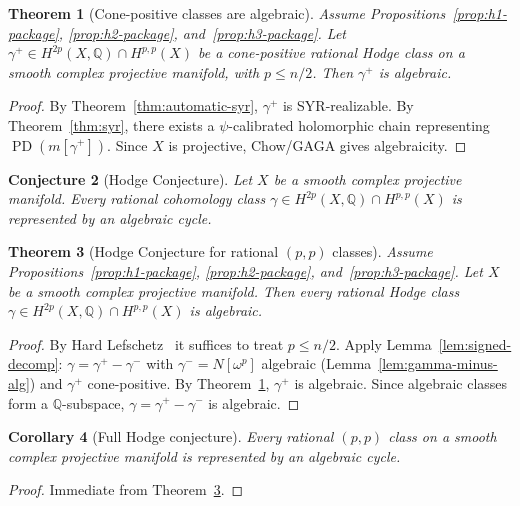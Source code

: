 \documentclass[11pt]{article}
\numberwithin{equation}{section}
\theoremstyle{plain}
\newtheorem{theorem}{Theorem}[section]
\newtheorem{conjecture}[theorem]{Conjecture}
\newtheorem{corollary}[theorem]{Corollary}
\theoremstyle{definition}
\theoremstyle{remark}
\DeclareMathOperator{\PD}{PD}
\newcommand{\Q}{\mathbb{Q}}
\begin{document}
\begin{theorem}[Cone-positive classes are algebraic]
\label{thm:effective-algebraic}
Assume Propositions~\ref{prop:h1-package}, \ref{prop:h2-package}, and~\ref{prop:h3-package}.
Let $\gamma^+\in H^{2p}(X,\Q)\cap H^{p,p}(X)$ be a cone-positive
rational Hodge class on a smooth complex projective manifold, with
$p\le n/2$.  Then $\gamma^+$ is algebraic.
\end{theorem}

\begin{proof}
By Theorem~\ref{thm:automatic-syr}, $\gamma^+$ is SYR-realizable.
By Theorem~\ref{thm:syr}, there exists a $\psi$-calibrated holomorphic
chain representing $\PD(m[\gamma^+])$.
Since $X$ is projective, Chow/GAGA gives algebraicity.
\end{proof}

\begin{conjecture}[Hodge Conjecture]\label{conj:hodge-conjecture}
Let $X$ be a smooth complex projective manifold.  Every rational
cohomology class $\gamma\in H^{2p}(X,\Q)\cap H^{p,p}(X)$ is
represented by an algebraic cycle.
\end{conjecture}

\begin{theorem}[Hodge Conjecture for rational $(p,p)$ classes]
\label{thm:main-hodge}
Assume Propositions~\ref{prop:h1-package}, \ref{prop:h2-package}, and~\ref{prop:h3-package}.
Let $X$ be a smooth complex projective manifold.  Then every rational
Hodge class $\gamma\in H^{2p}(X,\Q)\cap H^{p,p}(X)$ is algebraic.
\end{theorem}

\begin{proof}
By Hard Lefschetz~\cite{Voisin02,GH78} it suffices to treat $p\le n/2$.
Apply Lemma~\ref{lem:signed-decomp}: $\gamma=\gamma^+-\gamma^-$ with
$\gamma^-=N[\omega^p]$ algebraic (Lemma~\ref{lem:gamma-minus-alg}) and
$\gamma^+$ cone-positive.
By Theorem~\ref{thm:effective-algebraic}, $\gamma^+$ is algebraic.
Since algebraic classes form a $\Q$-subspace,
$\gamma=\gamma^+-\gamma^-$ is algebraic.
\end{proof}

\begin{corollary}[Full Hodge conjecture]\label{cor:full-hodge}
Every rational $(p,p)$ class on a smooth complex projective manifold is
represented by an algebraic cycle.
\end{corollary}

\begin{proof}
Immediate from Theorem~\ref{thm:main-hodge}.
\end{proof}
\end{document}
